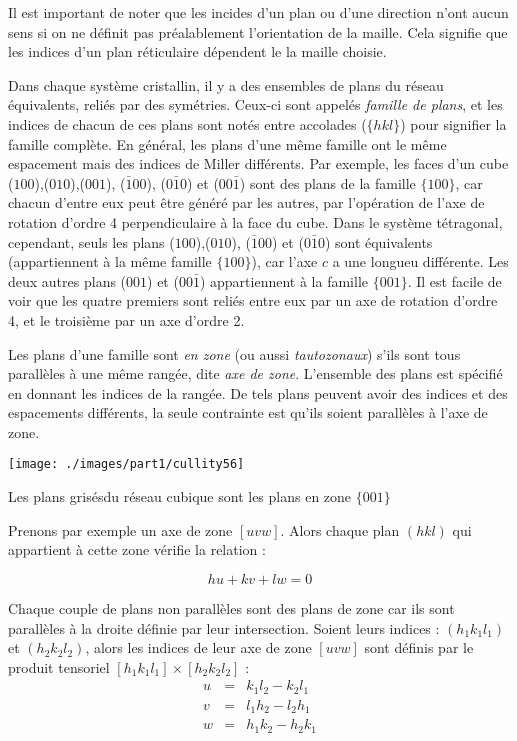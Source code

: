 Il est important de noter que les incides d'un plan ou d'une direction n'ont
aucun sens si on ne définit pas préalablement l'orientation de la maille. Cela
signifie que les indices d'un plan réticulaire dépendent le la maille choisie.

Dans chaque système cristallin, il y a des ensembles de plans du réseau
équivalents, reliés par des symétries. Ceux-ci sont appelés \emph{famille de
plans}, et les indices de chacun de ces plans sont notés entre accolades
($\{hkl\}$) pour signifier la famille complète. En général, les plans d'une même
famille ont le même espacement mais des indices de Miller différents. Par
exemple, les faces d'un cube ($100$),($010$),($001$), ($\bar{1}00$),
($0\bar{1}0$) et ($00\bar{1}$) sont des plans de la famille $\{100\}$, car chacun
d'entre eux peut être généré par les autres, par l'opération de l'axe de rotation
d'ordre 4 perpendiculaire à la face du cube. Dans le système tétragonal,
cependant, seuls les plans ($100$),($010$), ($\bar{1}00$) et ($0\bar{1}0$) sont
équivalents (appartiennent à la même famille $\{100\}$), car l'axe $c$ a une
longueu différente. Les deux autres plans ($001$) et ($00\bar{1}$) appartiennent
à la famille $\{001\}$. Il est facile de voir que les quatre premiers sont reliés
entre eux par un axe de rotation d'ordre 4, et le troisième par un axe d'ordre 2.

Les plans d'une famille sont \emph{en zone} (ou aussi \emph{tautozonaux}) s'ils
sont tous parallèles à une même rangée, dite \emph{axe de zone}. L'ensemble des
plans est spécifié en donnant les indices de la rangée. De tels plans peuvent
avoir des indices et des espacements différents, la seule contrainte est qu'ils
soient parallèles à l'axe de zone.

\begin{marginfigure}
    \texttt{[image: ./images/part1/cullity56]}
    \caption{Les plans grisésdu réseau cubique sont les plans en zone $\{001\}$}
    \label{fig:tautozonaux}
\end{marginfigure}

Prenons par exemple un axe de zone $[uvw]$. Alors chaque plan $(hkl)$ qui
appartient à cette zone vérifie la relation :

\begin{equation}
    hu + kv + lw = 0
\end{equation}

Chaque couple de plans non parallèles sont des plans de zone car ils sont
parallèles à la droite définie par leur intersection. Soient leurs indices :
$(h_1k_1l_1)$ et $(h_2k_2l_2)$, alors les indices de leur axe de zone $[uvw]$
sont définis par le produit tensoriel $[h_1k_1l_1] \times [h_2k_2l_2]$ :
\begin{eqnarray}
    u & = & k_1 l_2 - k_2 l_1\\
    v & = & l_1 h_2 - l_2 h_1\\
    w & = & h_1 k_2 - h_2 k_1
\end{eqnarray}


